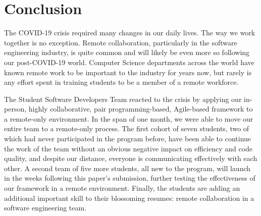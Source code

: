 \section{Conclusion}
The COVID-19 crisis required many changes in our daily lives. The way we work together is no exception. Remote collaboration, particularly in the software engineering industry, is quite common and will likely be even more so following our post-COVID-19 world. Computer Science departments across the world have known remote work to be important to the industry for years now, but rarely is any effort spent in training students to be a member of a remote workforce.

The Student Software Developers Team reacted to the crisis by applying our in-person, highly collaborative, pair programming-based, Agile-based framework to a remote-only environment. In the span of one month, we were able to move our entire team to a remote-only process. The first cohort of seven students, two of which had never participated in the program before, have been able to continue the work of the team without an obvious negative impact on efficiency and code quality, and despite our distance, everyone is communicating effectively with each other. A second team of five more students, all new to the program, will launch in the weeks following this paper's submission, further testing the effectiveness of our framework in a remote environment. Finally, the students are adding an additional important skill to their blossoming resumes: remote collaboration in a software engineering team.
